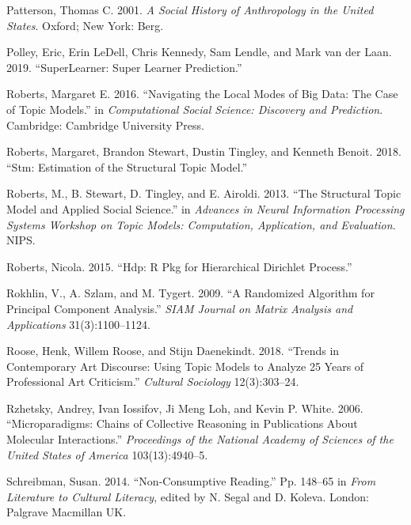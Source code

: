 \documentclass[]{book}
\theoremstyle{definition}
\theoremstyle{definition}
\theoremstyle{definition}
\theoremstyle{remark}
\begin{document}
\leavevmode\hypertarget{ref-Patterson2001Social}{}%
Patterson, Thomas C. 2001. \emph{A Social History of Anthropology in the
United States}. Oxford; New York: Berg.

\leavevmode\hypertarget{ref-Polley2019SuperLearner}{}%
Polley, Eric, Erin LeDell, Chris Kennedy, Sam Lendle, and Mark van der
Laan. 2019. ``SuperLearner: Super Learner Prediction.''

\leavevmode\hypertarget{ref-Roberts2016Navigating}{}%
Roberts, Margaret E. 2016. ``Navigating the Local Modes of Big Data: The
Case of Topic Models.'' in \emph{Computational Social Science: Discovery
and Prediction}. Cambridge: Cambridge University Press.

\leavevmode\hypertarget{ref-Roberts2018stm}{}%
Roberts, Margaret, Brandon Stewart, Dustin Tingley, and Kenneth Benoit.
2018. ``Stm: Estimation of the Structural Topic Model.''

\leavevmode\hypertarget{ref-Roberts2013structural}{}%
Roberts, M., B. Stewart, D. Tingley, and E. Airoldi. 2013. ``The
Structural Topic Model and Applied Social Science.'' in \emph{Advances
in Neural Information Processing Systems Workshop on Topic Models:
Computation, Application, and Evaluation}. NIPS.

\leavevmode\hypertarget{ref-Roberts2015pkg}{}%
Roberts, Nicola. 2015. ``Hdp: R Pkg for Hierarchical Dirichlet
Process.''

\leavevmode\hypertarget{ref-Rokhlin2009Randomized}{}%
Rokhlin, V., A. Szlam, and M. Tygert. 2009. ``A Randomized Algorithm for
Principal Component Analysis.'' \emph{SIAM Journal on Matrix Analysis
and Applications} 31(3):1100--1124.

\leavevmode\hypertarget{ref-Roose2018Trends}{}%
Roose, Henk, Willem Roose, and Stijn Daenekindt. 2018. ``Trends in
Contemporary Art Discourse: Using Topic Models to Analyze 25 Years of
Professional Art Criticism.'' \emph{Cultural Sociology} 12(3):303--24.

\leavevmode\hypertarget{ref-Rzhetsky2006Microparadigms}{}%
Rzhetsky, Andrey, Ivan Iossifov, Ji Meng Loh, and Kevin P. White. 2006.
``Microparadigms: Chains of Collective Reasoning in Publications About
Molecular Interactions.'' \emph{Proceedings of the National Academy of
Sciences of the United States of America} 103(13):4940--5.

\leavevmode\hypertarget{ref-Schreibman2014NonConsumptive}{}%
Schreibman, Susan. 2014. ``Non-Consumptive Reading.'' Pp. 148--65 in
\emph{From Literature to Cultural Literacy}, edited by N. Segal and D.
Koleva. London: Palgrave Macmillan UK.
\end{document}
